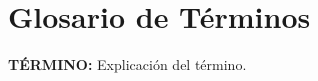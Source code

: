\clearpage
\pagestyle{fancy} %


\cleardoublepage

\chapter*{Glosario de Términos}

\textbf{TÉRMINO:} Explicación del término. 
